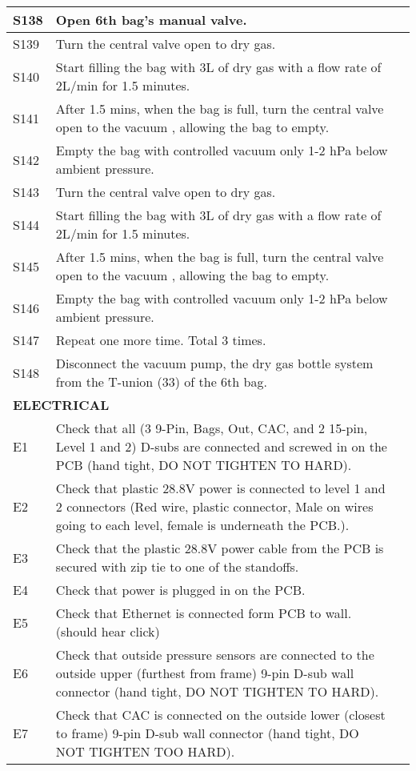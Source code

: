 \begin{longtable} {|m{}|m{}|m{}|}
S138 & Open 6th bag's manual valve. & \\ \hline
S139 & Turn the central valve open to dry gas. & \\ \hline
S140 & Start filling the bag with 3L of dry gas with a flow rate of 2L/min for 1.5 minutes. & \\ \hline
S141 & After 1.5 mins, when the bag is full, turn the central valve open to the vacuum , allowing the bag to empty. & \\ \hline
S142 & Empty the bag with controlled vacuum only 1-2 hPa below ambient pressure. & \\ \hline
S143 & Turn the central valve open to dry gas. & \\ \hline
S144 & Start filling the bag with 3L of dry gas with a flow rate of 2L/min for 1.5 minutes. & \\ \hline
S145 & After 1.5 mins, when the bag is full, turn the central valve open to the vacuum , allowing the bag to empty. & \\ \hline
S146 & Empty the bag with controlled vacuum only 1-2 hPa below ambient pressure. & \\ \hline
S147 & Repeat one more time. Total 3 times. & \\ \hline
S148 & Disconnect the vacuum pump, the dry gas bottle system from the T-union (33) of the 6th bag. & \\ \hline
\multicolumn{2}{|l|}{  \textbf{ELECTRICAL} } & \\ \hline
E1 & Check that all (3 9-Pin, Bags, Out, CAC, and 2 15-pin, Level 1 and 2) D-subs are connected and screwed in on the PCB (hand tight, DO NOT TIGHTEN TO HARD). & \\ \hline
E2 & Check that plastic 28.8V power is connected to level 1 and 2 connectors (Red wire, plastic connector, Male on wires going to each level, female is underneath the PCB.).& \\ \hline
E3 & Check that the plastic 28.8V power cable from the PCB is secured with zip tie to one of the standoffs. & \\ \hline 
E4 & Check that power is plugged in on the PCB. & \\ \hline
E5 & Check that Ethernet is connected form PCB to wall. (should hear click) & \\ \hline
E6 & Check that outside pressure sensors are connected to the outside upper (furthest from frame) 9-pin D-sub wall connector (hand tight, DO NOT TIGHTEN TO HARD). & \\ \hline
E7 & Check that CAC is connected on the outside lower (closest to frame) 9-pin D-sub wall connector (hand tight, DO NOT TIGHTEN TOO HARD). & \\ \hline

\end{longtable}
